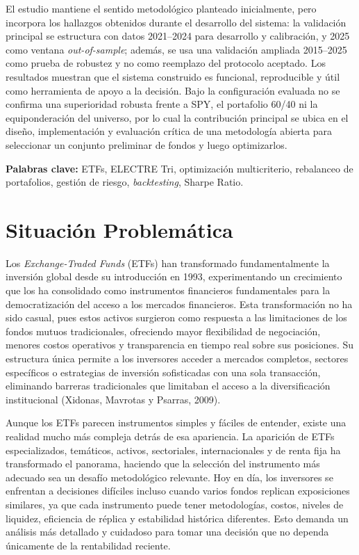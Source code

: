 \documentclass[12pt,letterpaper]{article}
\begin{document}
\begin{titlepage}
El estudio mantiene el sentido metodológico planteado inicialmente, pero incorpora los hallazgos obtenidos durante el desarrollo del sistema: la validación principal se estructura con datos 2021--2024 para desarrollo y calibración, y 2025 como ventana \textit{out-of-sample}; además, se usa una validación ampliada 2015--2025 como prueba de robustez y no como reemplazo del protocolo aceptado. Los resultados muestran que el sistema construido es funcional, reproducible y útil como herramienta de apoyo a la decisión. Bajo la configuración evaluada no se confirma una superioridad robusta frente a SPY, el portafolio 60/40 ni la equiponderación del universo, por lo cual la contribución principal se ubica en el diseño, implementación y evaluación crítica de una metodología abierta para seleccionar un conjunto preliminar de fondos y luego optimizarlos.

\textbf{Palabras clave:} ETFs, ELECTRE Tri, optimización multicriterio, rebalanceo de portafolios, gestión de riesgo, \textit{backtesting}, Sharpe Ratio.
\end{titlepage}

\tableofcontents
\newpage
\renewcommand{\listfigurename}{Lista de figuras}
\renewcommand{\listtablename}{Lista de tablas}
\listoffigures
\listoftables
\newpage

\clearpage
\section{Situación Problemática}

Los \textit{Exchange-Traded Funds} (ETFs) han transformado fundamentalmente la inversión global desde su introducción en 1993, experimentando un crecimiento que los ha consolidado como instrumentos financieros fundamentales para la democratización del acceso a los mercados financieros. Esta transformación no ha sido casual, pues estos activos surgieron como respuesta a las limitaciones de los fondos mutuos tradicionales, ofreciendo mayor flexibilidad de negociación, menores costos operativos y transparencia en tiempo real sobre sus posiciones. Su estructura única permite a los inversores acceder a mercados completos, sectores específicos o estrategias de inversión sofisticadas con una sola transacción, eliminando barreras tradicionales que limitaban el acceso a la diversificación institucional (Xidonas, Mavrotas y Psarras, 2009).

Aunque los ETFs parecen instrumentos simples y fáciles de entender, existe una realidad mucho más compleja detrás de esa apariencia. La aparición de ETFs especializados, temáticos, activos, sectoriales, internacionales y de renta fija ha transformado el panorama, haciendo que la selección del instrumento más adecuado sea un desafío metodológico relevante. Hoy en día, los inversores se enfrentan a decisiones difíciles incluso cuando varios fondos replican exposiciones similares, ya que cada instrumento puede tener metodologías, costos, niveles de liquidez, eficiencia de réplica y estabilidad histórica diferentes. Esto demanda un análisis más detallado y cuidadoso para tomar una decisión que no dependa únicamente de la rentabilidad reciente.
\end{document}
